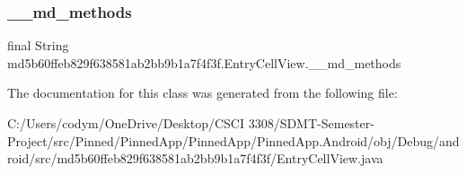 \subsubsection{\texorpdfstring{\+\_\+\+\_\+md\+\_\+methods}{\_\_md\_methods}}
{\footnotesize\ttfamily final String md5b60ffeb829f638581ab2bb9b1a7f4f3f.\+Entry\+Cell\+View.\+\_\+\+\_\+md\+\_\+methods\hspace{0.3cm}{\ttfamily [static]}}



The documentation for this class was generated from the following file\+:\begin{DoxyCompactItemize}
\item 
C\+:/\+Users/codym/\+One\+Drive/\+Desktop/\+C\+S\+C\+I 3308/\+S\+D\+M\+T-\/\+Semester-\/\+Project/src/\+Pinned/\+Pinned\+App/\+Pinned\+App/\+Pinned\+App.\+Android/obj/\+Debug/android/src/md5b60ffeb829f638581ab2bb9b1a7f4f3f/Entry\+Cell\+View.\+java\end{DoxyCompactItemize}
